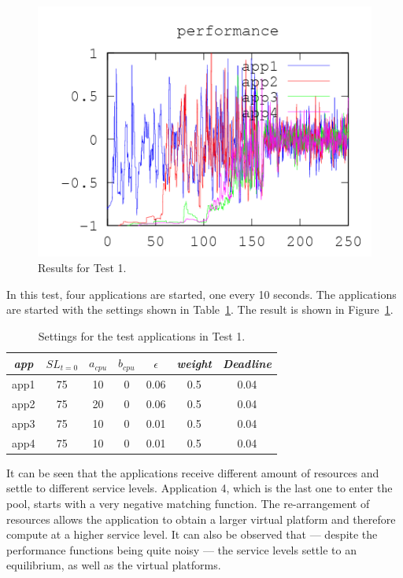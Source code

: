 \documentclass[nobiblatex]{LTHthesis}
\begin{document}
\begin{figure}[th]
\begin{minipage}{0.49\textwidth}
  \includegraphics[width=\textwidth]{"tools/plot/logs/test1/f"}
  \end{minipage}
\caption{Results for Test 1.}
\label{fig:test1}
\end{figure}

In this test, four applications are started, one every 10 seconds. 
The applications are started with the settings shown in 
Table~\ref{tab:settings_test1}. The result is shown in 
Figure~\ref{fig:test1}. 

\begin{table}[h!]
  \centering
  \begin{tabular}{|c|c|c|c|c|c|c|}
  \hline 
   \emph{app} & $SL_{t=0}$ & \textbf{$a_{cpu}$} & 
   \textbf{$b_{cpu}$} & \textbf{$\epsilon$} & \emph{weight} & 
   \emph{Deadline} \\ \hline
  app1 & 75 & 10 & 0 & 0.06 & 0.5 &0.04  \\ \hline
  app2 & 75 & 20 & 0 & 0.06 & 0.5 &0.04  \\ \hline
  app3 & 75 & 10 & 0 & 0.01 & 0.5 &0.04  \\ \hline
  app4 & 75 & 10 & 0 & 0.01 & 0.5 &0.04  \\ \hline		
  \end{tabular}
  \caption{Settings for the test applications in Test 1.}
  \label{tab:settings_test1}
\end{table}

It can be seen that the applications receive different amount of resources
and settle to different service levels. Application 4, which is the last
one to enter the pool, starts with a very negative matching function. The
re-arrangement of resources allows the application to obtain a larger virtual
platform and therefore compute at a higher service level. It can also be
observed that --- despite the performance functions being quite noisy --- the
service levels settle to an equilibrium, as well as the virtual platforms.
\end{document}
